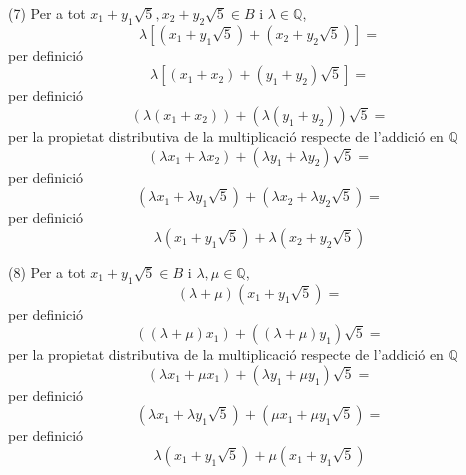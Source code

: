 \begin{solucio}
(7) Per a tot $x_{1}+y_{1}\sqrt{5},x_{2}+y_{2}\sqrt{5}\in B$ i $\lambda \in
\mathbb{Q}$,
\begin{equation*}
\lambda \left[ \left( x_{1}+y_{1}\sqrt{5}\right) +\left( x_{2}+y_{2}\sqrt{5}%
\right) \right] =
\end{equation*}%
per definició%
\begin{equation*}
\lambda \left[ (x_{1}+x_{2})+(y_{1}+y_{2})\sqrt{5}\right] =
\end{equation*}%
per definició%
\begin{equation*}
\left( \lambda (x_{1}+x_{2})\right) +\left( \lambda (y_{1}+y_{2})\right)
\sqrt{5}=
\end{equation*}%
per la propietat distributiva de la multiplicació respecte de l'addició en $\mathbb{Q}$%
\begin{equation*}
(\lambda x_{1}+\lambda x_{2})+\left( \lambda y_{1}+\lambda y_{2}\right)
\sqrt{5}=
\end{equation*}%
per definició%
\begin{equation*}
\left( \lambda x_{1}+\lambda y_{1}\sqrt{5}\right) +\left( \lambda
x_{2}+\lambda y_{2}\sqrt{5}\right) =
\end{equation*}%
per definició%
\begin{equation*}
\lambda \left( x_{1}+y_{1}\sqrt{5}\right) +\lambda \left( x_{2}+y_{2}\sqrt{5}%
\right)
\end{equation*}

(8) Per a tot $x_{1}+y_{1}\sqrt{5}\in B$ i $\lambda ,\mu \in \mathbb{Q}$,
\begin{equation*}
\left( \lambda +\mu \right) \left( x_{1}+y_{1}\sqrt{5}\right) =
\end{equation*}%
per definició%
\begin{equation*}
\left( \left( \lambda +\mu \right) x_{1}\right) +\left( \left( \lambda +\mu
\right) y_{1}\right) \sqrt{5}=
\end{equation*}%
per la propietat distributiva de la multiplicació respecte de l'addició en $\mathbb{Q}$%
\begin{equation*}
\left( \lambda x_{1}+\mu x_{1}\right) +\left( \lambda y_{1}+\mu y_{1}\right)
\sqrt{5}=
\end{equation*}%
per definició%
\begin{equation*}
\left( \lambda x_{1}+\lambda y_{1}\sqrt{5}\right) +\left( \mu x_{1}+\mu y_{1}%
\sqrt{5}\right) =
\end{equation*}%
per definició%
\begin{equation*}
\lambda \left( x_{1}+y_{1}\sqrt{5}\right) +\mu \left( x_{1}+y_{1}\sqrt{5}%
\right)
\end{equation*}


\end{solucio}
